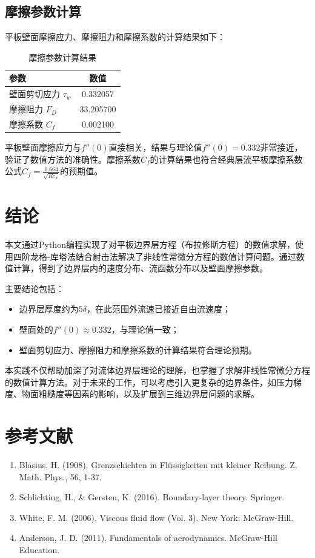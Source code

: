 \documentclass[12pt,a4paper]{article}
\begin{document}
\subsection{摩擦参数计算}
平板壁面摩擦应力、摩擦阻力和摩擦系数的计算结果如下：

\begin{table}[htbp]
\centering
\caption{摩擦参数计算结果}
\label{tab:friction}
\begin{tabular}{lc}
\toprule
参数 & 数值 \\
\midrule
壁面剪切应力 $\tau_w$ & 0.332057 \\
摩擦阻力 $F_D$ & 33.205700 \\
摩擦系数 $C_f$ & 0.002100 \\
\bottomrule
\end{tabular}
\end{table}

平板壁面摩擦应力与$f''(0)$直接相关，结果与理论值$f''(0) = 0.332$非常接近，验证了数值方法的准确性。摩擦系数$C_f$的计算结果也符合经典层流平板摩擦系数公式$C_f = \frac{0.664}{\sqrt{Re_x}}$的预期值。

\section{结论}
本文通过Python编程实现了对平板边界层方程（布拉修斯方程）的数值求解，使用四阶龙格-库塔法结合射击法解决了非线性常微分方程的数值计算问题。通过数值计算，得到了边界层内的速度分布、流函数分布以及壁面摩擦参数。

主要结论包括：
\begin{itemize}
    \item 边界层厚度约为$5\delta$，在此范围外流速已接近自由流速度；
    \item 壁面处的$f''(0) \approx 0.332$，与理论值一致；
    \item 壁面剪切应力、摩擦阻力和摩擦系数的计算结果符合理论预期。
\end{itemize}

本实践不仅帮助加深了对流体边界层理论的理解，也掌握了求解非线性常微分方程的数值计算方法。对于未来的工作，可以考虑引入更复杂的边界条件，如压力梯度、物面粗糙度等因素的影响，以及扩展到三维边界层问题的求解。

\section{参考文献}
\begin{enumerate}
    \item Blasius, H. (1908). Grenzschichten in Flüssigkeiten mit kleiner Reibung. Z. Math. Phys., 56, 1-37.
    \item Schlichting, H., \& Gersten, K. (2016). Boundary-layer theory. Springer.
    \item White, F. M. (2006). Viscous fluid flow (Vol. 3). New York: McGraw-Hill.
    \item Anderson, J. D. (2011). Fundamentals of aerodynamics. McGraw-Hill Education.
\end{enumerate}
\end{document}
